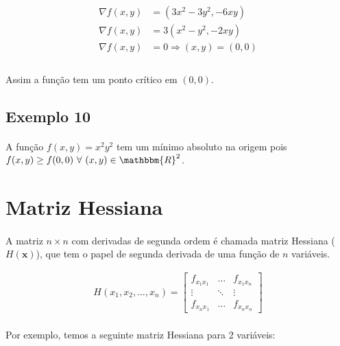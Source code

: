 \documentclass{article}
\begin{document}
            \begin{align*}
                \nabla f(x, y) &= (3x^2 - 3y^2, -6xy)\\
                \nabla f(x, y) &= 3 (x^2 - y^2, -2xy)\\
                \nabla f(x, y) &= 0 \Rightarrow (x, y) = (0,0)\\
            \end{align*}

            \paragraph{}
            Assim a função tem um ponto crítico em $(0,0)$.

        \subsection{Exemplo 10}
            \paragraph{}
            A função $f(x, y) = x^2y^2$ tem um mínimo absoluto na origem pois $f(x, y) \geq f(0,0) \text{ }\forall\text{ } (x, y) \in \mathbbm{R}^2$.
    
    \section{Matriz Hessiana}
        \paragraph{}
        A matriz $n \times n$ com derivadas de segunda ordem é chamada matriz Hessiana ($H(\textbf{x})$), que tem o papel
        de segunda derivada de uma função de $n$ variáveis.

        \begin{align*}
            H(x_1, x_2, \dots, x_n) =
            \begin{bmatrix}
                f_{x_1x_1} & \dots & f_{x_1x_n}\\
                \vdots & \ddots & \vdots\\
                f_{x_nx_1} & \dots & f_{x_nx_n}
            \end{bmatrix}
        \end{align*}

        \paragraph{}
        Por exemplo, temos a seguinte matriz Hessiana para 2 variáveis:
\end{document}
